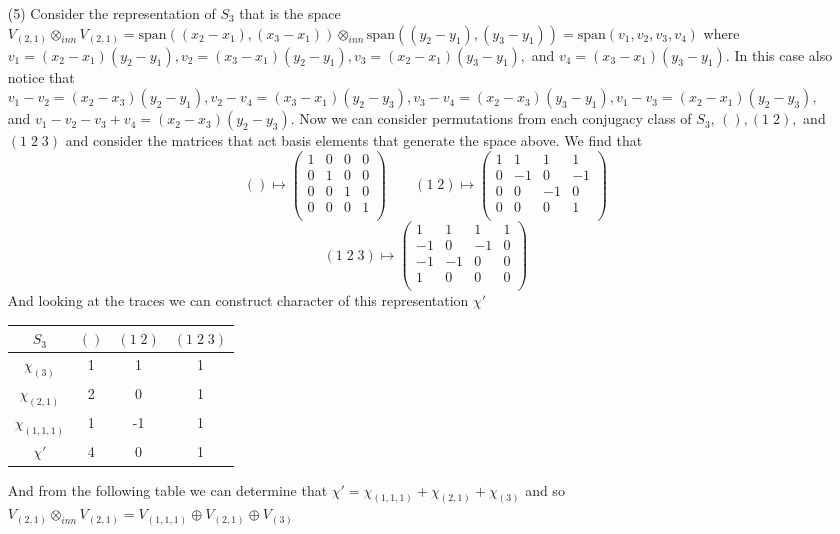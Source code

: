 \documentclass[12pt]{amsart}
\begin{document}
\begin{itemize}
\item[(5)] Consider the representation of $S_3$ that is the space $V_{(2,1)}\otimes_{inn} V_{(2,1)}=\text{span}((x_2-x_1),(x_3-x_1))\otimes_{inn} \text{span}((y_2-y_1),(y_3-y_1))=\text{span}(v_1,v_2,v_3,v_4)$ where $v_1=(x_2-x_1)(y_2-y_1),v_2=(x_3-x_1)(y_2-y_1),v_3=(x_2-x_1)(y_3-y_1),$ and $v_4=(x_3-x_1)(y_3-y_1)$. In this case also notice that $v_1-v_2=(x_2-x_3)(y_2-y_1), v_2-v_4=(x_3-x_1)(y_2-y_3), v_3-v_4=(x_2-x_3)(y_3-y_1), v_1-v_3=(x_2-x_1)(y_2-y_3), $ and $v_1-v_2-v_3+v_4=(x_2-x_3)(y_2-y_3)$. Now we can consider permutations from each conjugacy class of $S_3$, $(), (1\;2),$ and $(1\;2\;3)$ and consider the matrices that act basis elements that generate the space above. We find that 
$$()\mapsto \begin{pmatrix}1&0&0&0\\0&1&0&0\\0&0&1&0\\0&0&0&1\\\end{pmatrix}\;\;\;\;\;\;\;(1\;2)\mapsto \begin{pmatrix}1&1&1&1\\0&-1&0&-1\\0&0&-1&0\\0&0&0&1\\\end{pmatrix}$$
$$(1\;2\;3)\mapsto \begin{pmatrix}1&1&1&1\\-1&0&-1&0\\-1&-1&0&0\\1&0&0&0\\\end{pmatrix}$$
And looking at the traces we can construct character of this representation $\chi'$

\begin{tabular}{c|ccc}
    $S_3$ & $()$ & $(1\;2)$ & $(1\;2\;3)$\\\hline
    $\chi_{(3)}$ & 1& 1&1  \\
    $\chi_{(2,1)}$ & 2& 0&1\\
    $\chi_{(1,1,1)}$ & 1& -1&1\\
    $\chi'$ & 4& 0&1\\
\end{tabular}

 And from the following table we can determine that $\chi'=\chi_{(1,1,1)}+\chi_{(2,1)}+\chi_{(3)}$ and so $V_{(2,1)}\otimes_{inn} V_{(2,1)}=V_{(1,1,1)}\oplus V_{(2,1)}\oplus V_{(3)}$\\


\end{itemize}
\end{document}
